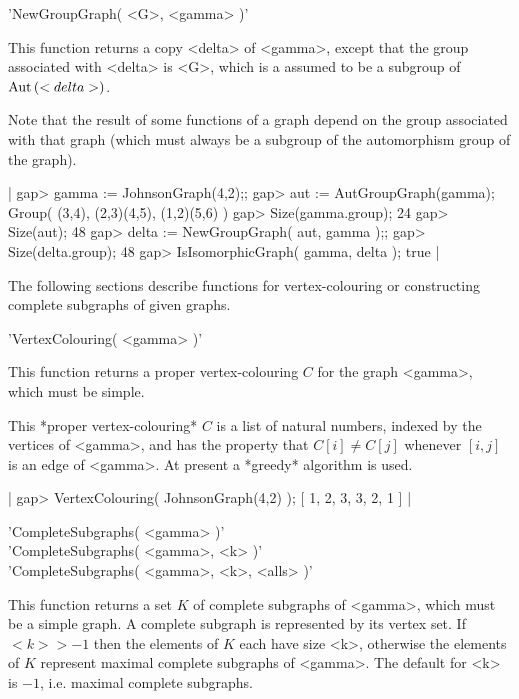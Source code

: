 
'NewGroupGraph( <G>, <gamma> )'

This  function returns a  copy <delta> of <gamma>,  except that the group
associated with  <delta> is <G>, which is a assumed to be  a subgroup  of
${\rm Aut}\,(<delta>)$.

Note that the result of  some functions  of  a graph  depend on the group
associated  with  that graph  (which must always  be  a  subgroup  of the
automorphism group of the graph).

|    gap> gamma := JohnsonGraph(4,2);;
    gap> aut := AutGroupGraph(gamma);
    Group( (3,4), (2,3)(4,5), (1,2)(5,6) )
    gap> Size(gamma.group);
    24
    gap> Size(aut);
    48
    gap> delta := NewGroupGraph( aut, gamma );;
    gap> Size(delta.group);
    48
    gap> IsIsomorphicGraph( gamma, delta );
    true |


The following   sections  describe  functions  for   vertex-colouring  or
constructing complete subgraphs of given graphs.


'VertexColouring( <gamma> )'

This  function  returns  a proper  vertex-colouring  $C$  for  the  graph
<gamma>, which must be simple.

This *proper vertex-colouring* $C$ is a list  of natural numbers, indexed
by  the  vertices of <gamma>, and  has the  property that $C[i]\not=C[j]$
whenever $[i,j]$ is an edge of <gamma>.  At  present a *greedy* algorithm
is used.

|    gap> VertexColouring( JohnsonGraph(4,2) );
    [ 1, 2, 3, 3, 2, 1 ] |


'CompleteSubgraphs( <gamma> )' \\
'CompleteSubgraphs( <gamma>, <k> )' \\
'CompleteSubgraphs( <gamma>, <k>, <alls> )'

This function returns a set $K$  of complete subgraphs of <gamma>,  which
must be a simple graph.  A complete subgraph is represented by its vertex
set.   If  $<k> > -1$  then the  elements of $K$  each  have  size  <k>,
otherwise the  elements  of $K$ represent  maximal complete subgraphs  of
<gamma>.  The default for <k> is $-1$, i.e. maximal complete subgraphs.

